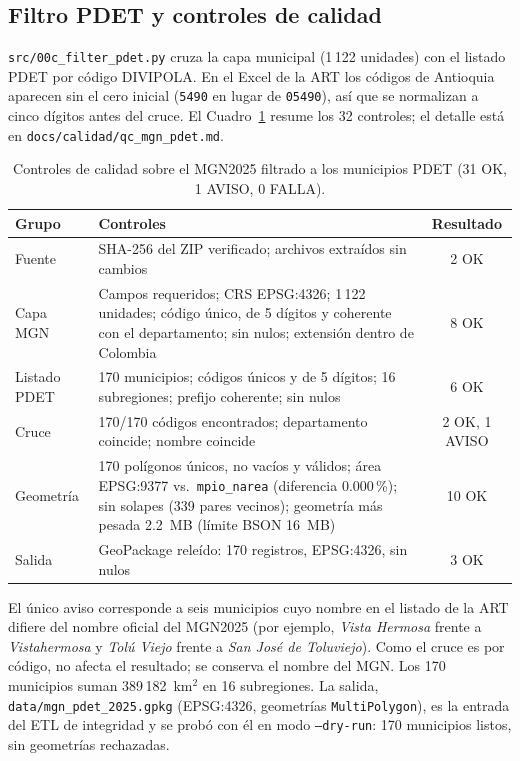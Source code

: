 \subsection{Filtro PDET y controles de calidad}
\texttt{src/00c\_filter\_pdet.py} cruza la capa municipal (1\,122 unidades) con el listado PDET por código
DIVIPOLA. En el Excel de la ART los códigos de Antioquia aparecen sin el cero inicial (\texttt{5490} en lugar de
\texttt{05490}), así que se normalizan a cinco dígitos antes del cruce. El Cuadro~\ref{tab:qc_mgn} resume los
32 controles; el detalle está en \texttt{docs/calidad/qc\_mgn\_pdet.md}.

\begin{table}[!htbp]
\centering\small
\begin{tabular}{@{}p{2.3cm}p{10.2cm}c@{}}
\toprule
Grupo & Controles & Resultado \\
\midrule
Fuente & SHA-256 del ZIP verificado; archivos extraídos sin cambios & 2 OK \\
Capa MGN & Campos requeridos; CRS EPSG:4326; 1\,122 unidades; código único, de 5 dígitos y coherente con el
departamento; sin nulos; extensión dentro de Colombia & 8 OK \\
Listado PDET & 170 municipios; códigos únicos y de 5 dígitos; 16 subregiones; prefijo coherente; sin nulos & 6 OK \\
Cruce & 170/170 códigos encontrados; departamento coincide; nombre coincide & 2 OK, 1 AVISO \\
Geometría & 170 polígonos únicos, no vacíos y válidos; área EPSG:9377 vs.\ \texttt{mpio\_narea} (diferencia
0.000\,\%); sin solapes (339 pares vecinos); geometría más pesada 2.2~MB (límite BSON 16~MB) & 10 OK \\
Salida & GeoPackage releído: 170 registros, EPSG:4326, sin nulos & 3 OK \\
\bottomrule
\end{tabular}
\caption{Controles de calidad sobre el MGN2025 filtrado a los municipios PDET (31 OK, 1 AVISO, 0 FALLA).}
\label{tab:qc_mgn}
\end{table}

El único aviso corresponde a seis municipios cuyo nombre en el listado de la ART difiere del nombre oficial del
MGN2025 (por ejemplo, \emph{Vista Hermosa} frente a \emph{Vistahermosa} y \emph{Tolú Viejo} frente a \emph{San
José de Toluviejo}). Como el cruce es por código, no afecta el resultado; se conserva el nombre del MGN. Los 170
municipios suman 389\,182~km$^2$ en 16 subregiones. La salida, \texttt{data/mgn\_pdet\_2025.gpkg} (EPSG:4326,
geometrías \texttt{MultiPolygon}), es la entrada del ETL de integridad y se probó con él en modo
\texttt{--dry-run}: 170 municipios listos, sin geometrías rechazadas.
